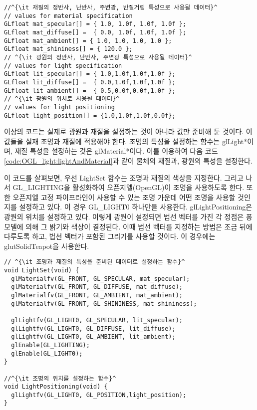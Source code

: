 \begin{algorithmbis}\label{code:OGL_light:preparingLightingData}
\lstset{language=C++, escapechar=^} 
\begin{lstlisting}
//^{\it 재질의 정반사, 난반사, 주변광, 반질거림 특성으로 사용될 데이터}^
// values for material specification
GLfloat mat_specular[] = { 1.0, 1.0f, 1.0f, 1.0f };
GLfloat mat_diffuse[] =  { 0.0, 1.0f, 1.0f, 1.0f };
GLfloat mat_ambient[] = { 1.0, 1.0, 1.0, 1.0 };
GLfloat mat_shininess[] = { 120.0 };
// ^{\it 광원의 정반사, 난반사, 주변광 특성으로 사용될 데이터}^
// values for light specification
GLfloat lit_specular[] = { 1.0,1.0f,1.0f,1.0f };
GLfloat lit_diffuse[] =  { 0.0,1.0f,1.0f,1.0f };
GLfloat lit_ambient[] =  { 0.5,0.0f,0.0f,1.0f };
// ^{\it 광원의 위치로 사용될 데이터}^
// values for light positioning
GLfloat light_position[] = {1.0,1.0f,1.0f,0.0f};
\end{lstlisting}
\end{algorithmbis}

이상의 코드는 실제로 광원과 재질을 설정하는 것이 아니라 값만 준비해 둔 것이다. 이 값들을 실재 조명과 재질에 적용해야 한다. 조명의 특성을 설정하는 
함수는 {\sf glLight*}이며, 재질 특성을 설정하는 것은 {\sf glMaterial*}이다. 
이를 이용하여 다음 코드 \ref{code:OGL_light:lightAndMaterial}과 같이 물체의 재질과, 광원의 특성을 설정한다.

이 코드를 살펴보면, 우선 {\sf LightSet} 함수는 조명과 재질의 색상을 지정한다. 그리고 나서 {\sf GL\_LIGHTING}을 활성화하여 오픈지엘(OpenGL)이 조명을 사용하도록 한다. 또한 오픈지엘 고정 파이프라인이 사용할 수 있는 조명 가운데 어떤 조명을 사용할 것인지를 설정하고 있다. 이 경우  {\sf GL\_LIGHT0} 하나만을 사용한다.
{\sf glLightPositioning}은 광원의 위치를 설정하고 있다. 이렇게 광원이 설정되면 법선 벡터를 가진 각 정점은 퐁 모델에 의해 그 밝기와 색상이 결정된다. 이때 법선 벡터를 지정하는 방법은 조금 뒤에 다루도록 하고, 법선 벡터가 포함된 그리기를 사용할 것이다. 이 경우에는 {\sf glutSolidTeapot}을 사용한다. 


\begin{algorithmbis}\label{code:OGL_light:lightAndMaterial}
\lstset{language=C++, escapechar=^} 
\begin{lstlisting}
// ^{\it 조명과 재질의 특성을 준비된 데이터로 설정하는 함수}^
void LightSet(void) {
  glMaterialfv(GL_FRONT, GL_SPECULAR, mat_specular);
  glMaterialfv(GL_FRONT, GL_DIFFUSE, mat_diffuse);
  glMaterialfv(GL_FRONT, GL_AMBIENT, mat_ambient);
  glMaterialfv(GL_FRONT, GL_SHININESS, mat_shininess);

  glLightfv(GL_LIGHT0, GL_SPECULAR, lit_specular);
  glLightfv(GL_LIGHT0, GL_DIFFUSE, lit_diffuse);
  glLightfv(GL_LIGHT0, GL_AMBIENT, lit_ambient);
  glEnable(GL_LIGHTING);
  glEnable(GL_LIGHT0);
}

//^{\it 조명의 위치를 설정하는 함수}^
void LightPositioning(void) {
  glLightfv(GL_LIGHT0, GL_POSITION,light_position);
}
\end{lstlisting}
\end{algorithmbis}

